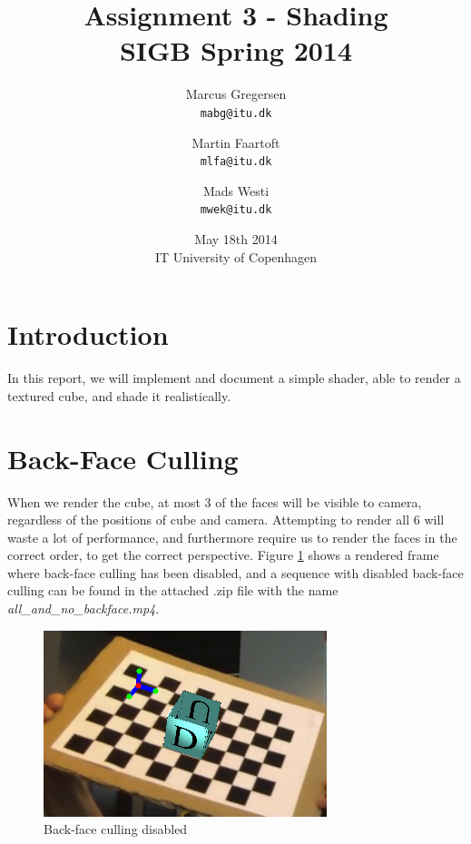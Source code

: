 \documentclass[a4paper,11pt]{article}
\begin{document}
\date{May 18th 2014\\ IT University of Copenhagen}
\title{Assignment 3 - Shading\\SIGB Spring 2014}

\author{Marcus Gregersen\\
\texttt{mabg@itu.dk}
\and Martin Faartoft\\
\texttt{mlfa@itu.dk}
\and Mads Westi\\
\texttt{mwek@itu.dk}}
\clearpage\maketitle
\thispagestyle{empty}
\setcounter{page}{1}
\newpage
\tableofcontents
\newpage


\section{Introduction}
In this report, we will implement and document a simple shader, able to render a textured cube, and shade it realistically.

\section{Back-Face Culling}
When we render the cube, at most 3 of the faces will be visible to camera, regardless of the positions of cube and camera. Attempting to render all 6 will waste a lot of performance, and furthermore require us to render the faces in the correct order, to get the correct perspective. Figure \ref{fig:no_culling} shows a rendered frame where back-face culling has been disabled, and a sequence with disabled back-face culling can be found in the attached .zip file with the name \emph{all\_and\_no\_backface.mp4}.

\begin{figure}[H]
  \centering
  \includegraphics[width=0.5\linewidth]{no_culling}
  \caption{Back-face culling disabled}
  \label{fig:no_culling}
\end{figure}
\end{document}
